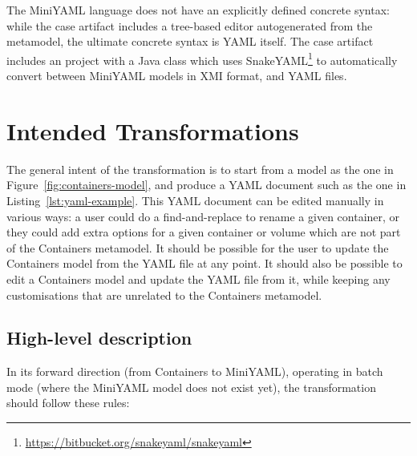 \documentclass[twocolumn]{ceurart}
\begin{document}


The MiniYAML language does not have an explicitly defined concrete syntax: while
the case artifact includes a tree-based editor autogenerated from the metamodel,
the ultimate concrete syntax is YAML itself. The case artifact includes an
 project with a
 Java class which uses
SnakeYAML\footnote{\url{https://bitbucket.org/snakeyaml/snakeyaml}} to
automatically convert between Mini\-YAML models in XMI format, and YAML files.

\section{Intended Transformations}

The general intent of the transformation is to start from a model as the one in
Figure~\ref{fig:containers-model}, and produce a YAML document such as the one
in Listing~\ref{lst:yaml-example}. This YAML document can be edited manually in
various ways: a user could do a find-and-replace to rename a given container, or
they could add extra options for a given container or volume which are not part
of the Containers metamodel. It should be possible for the user to update the
Containers model from the YAML file at any point. It should also be possible to
edit a Containers model and update the YAML file from it, while keeping any
customisations that are unrelated to the Containers metamodel.

\subsection{High-level description}

In its forward direction (from Containers to MiniYAML), operating in batch mode
(where the MiniYAML model does not exist yet), the transformation should follow
these rules:
\end{document}
